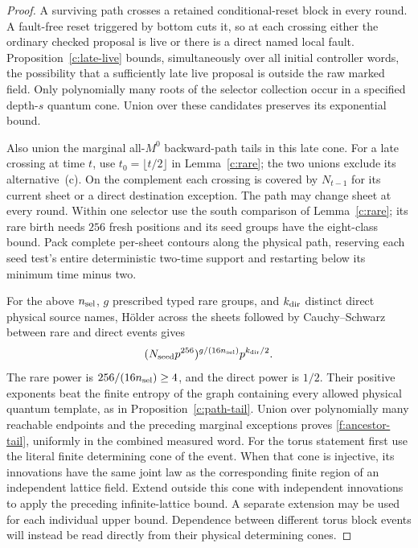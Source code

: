 \begin{proof}
A surviving path crosses a retained conditional-reset block in every round.
A fault-free reset triggered by bottom cuts it, so at each crossing either
the ordinary checked proposal is live or there is a direct named
local fault. Proposition~\ref{c:late-live} bounds, simultaneously over all
initial controller words, the possibility that a sufficiently late
live proposal is outside the raw marked field. Only polynomially
many roots of the selector collection occur in a specified depth-\(s\)
quantum cone. Union over these candidates preserves its exponential
bound.

Also union the marginal all-\(M^0\) backward-path tails in this late
cone. For a late crossing at time \(t\), use
\(t_0=\lfloor t/2\rfloor\) in Lemma~\ref{c:rare}; the two unions
exclude its alternative~(c). On the complement each crossing is
covered by \(N_{t-1}\) for its current sheet or a direct destination
exception. The path may change sheet at every round. Within
one selector use the south comparison of Lemma~\ref{c:rare}; its
rare birth needs \(256\) fresh positions and its seed groups have
the eight-class bound. Pack complete per-sheet contours along the
physical path, reserving each seed test's entire deterministic
two-time support and restarting below its minimum time minus two.

For the above \(n_{\rm sel}\), \(g\) prescribed typed rare groups, and \(k_{\rm dir}\) distinct
direct physical source names, H\"older across the sheets followed by
Cauchy--Schwarz between rare and direct events gives
\[
 (N_{\rm seed}p^{256})^{g/(16n_{\rm sel})}p^{k_{\rm dir}/2}.
\]
The rare power is \(256/(16n_{\rm sel})\ge4\), and the direct power is \(1/2\).
Their positive exponents beat the finite entropy of the graph
containing every allowed physical quantum template, as in
Proposition~\ref{c:path-tail}. Union over polynomially many
reachable endpoints and the preceding marginal exceptions proves
\eqref{f:ancestor-tail}, uniformly in the combined measured word.
For the torus statement first use the literal finite determining
cone of the event. When that cone is injective, its innovations have
the same joint law as the corresponding finite region of an
independent lattice field. Extend outside this cone with independent
innovations to apply the preceding infinite-lattice bound. A separate
extension may be used for each individual upper bound. Dependence
between different torus block events will instead be read directly
from their physical determining cones.
\end{proof}

